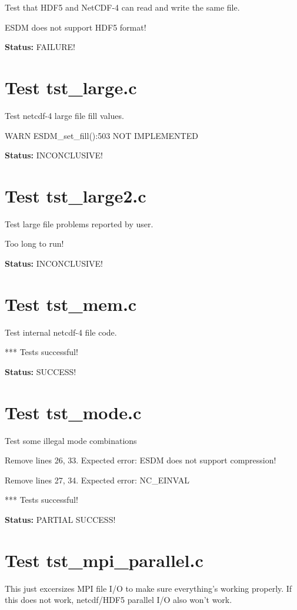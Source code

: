 Test that HDF5 and NetCDF-4 can read and write the same file.

ESDM does not support HDF5 format!

{\bf \large Status: } FAILURE!

\section{Test tst\_large.c}

Test netcdf-4 large file fill values.

WARN ESDM\_set\_fill():503 NOT IMPLEMENTED

{\bf \large Status: } INCONCLUSIVE!

\section{Test tst\_large2.c}

Test large file problems reported by user.

Too long to run!

{\bf \large Status: } INCONCLUSIVE!

\section{Test tst\_mem.c}

Test internal netcdf-4 file code.

*** Tests successful!

{\bf \large Status: } SUCCESS!

\section{Test tst\_mode.c}

Test some illegal mode combinations

Remove lines 26, 33. Expected error: ESDM does not support compression!

Remove lines 27, 34. Expected error: NC\_EINVAL

*** Tests successful!

{\bf \large Status: } PARTIAL SUCCESS!

\section{Test tst\_mpi\_parallel.c}

This just excersizes MPI file I/O to make sure everything's working properly. If this does not work, netcdf/HDF5 parallel I/O also won't work.

